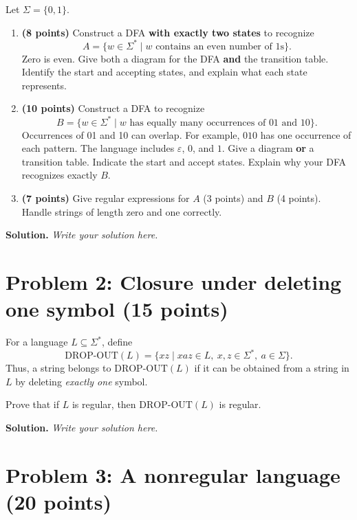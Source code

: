 \documentclass[11pt,a4paper]{article}
\newcommand{\eps}{\varepsilon}
\begin{document}
Let $\Sigma=\{0,1\}$.
\begin{enumerate}
    \item[(a)] \textbf{(8 points)}
    Construct a DFA \textbf{with exactly two states} to recognize
    \[
        A=\{w\in\Sigma^* \mid w \text{ contains an even number of } 1 \text{s}\}.
    \]
    Zero is even.
    Give both a diagram for the DFA \textbf{and} the transition table.  Identify the start and accepting states, and explain what each state represents.

    \item[(b)] \textbf{(10 points)}
    Construct a DFA to recognize
    \[
        B=\{w\in\Sigma^* \mid w \text{ has equally many occurrences of } 01 \text{ and }10\}.
    \]
    Occurrences of 01 and 10 can overlap. For example, $010$ has one occurrence of each pattern.
    The language includes $\eps$, $0$, and $1$.
    Give a diagram \textbf{or} a transition table. Indicate the start and accept states. Explain why your DFA recognizes exactly $B$.

    \item[(c)] \textbf{(7 points)}
    Give regular expressions for $A$ (3 points) and $B$ (4 points). Handle strings of length zero and one correctly.
\end{enumerate}

\textbf{Solution.} \textit{Write your solution here.}

\vspace{5em}

\section*{Problem 2: Closure under deleting one symbol (15 points)}

For a language $L\subseteq\Sigma^*$, define
\[
    \mathrm{DROP\mbox{-}OUT}(L) = \{xz \mid xaz\in L,\ x,z\in\Sigma^*,\ a\in\Sigma\}.
\]
Thus, a string belongs to $\mathrm{DROP\mbox{-}OUT}(L)$ if it can be obtained from a string in $L$ by deleting \emph{exactly one} symbol.

Prove that if $L$ is regular, then $\mathrm{DROP\mbox{-}OUT}(L)$ is regular.

\textbf{Solution.} \textit{Write your solution here.}

\vspace{5em}

\section*{Problem 3: A nonregular language (20 points)}
\end{document}
